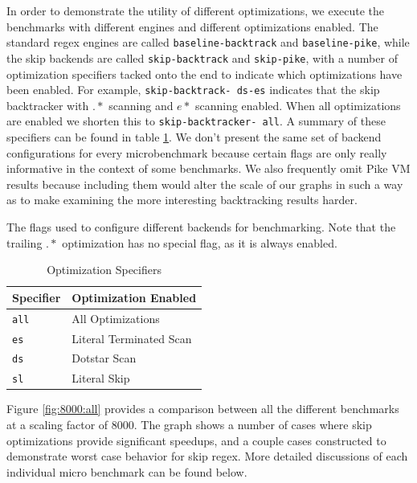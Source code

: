 In order to demonstrate the utility of different optimizations,
we execute the benchmarks with different engines and different
optimizations enabled. The standard regex engines are called
\texttt{baseline\allowbreak -\allowbreak backtrack} and
\texttt{baseline\allowbreak -\allowbreak pike}, while the
skip backends are called \texttt{skip\allowbreak -\allowbreak backtrack}
and \texttt{skip\allowbreak -\allowbreak pike},
with a number of optimization specifiers tacked onto the end to
indicate which optimizations have been enabled. For example,
\texttt{skip\allowbreak -\allowbreak backtrack\allowbreak -\allowbreak
        ds\allowbreak -\allowbreak es}
indicates that the skip backtracker with $.*$ scanning and $e*$ scanning
enabled. When all optimizations are enabled we shorten this to
\texttt{skip\allowbreak -\allowbreak backtracker\allowbreak -\allowbreak
all}. A summary of these specifiers can be found in table \ref{table:optspec}.
We don't present the same set of backend configurations for
every microbenchmark because certain flags are only really informative
in the context of some benchmarks. We also frequently omit Pike VM
results because including them would alter the scale of our
graphs in such a way as to make examining the more interesting
backtracking results harder.

\begin{table}
\caption{Optimization Specifiers}
\label{table:optspec}
\centering

The flags used to configure different backends for benchmarking.
Note that the trailing $.*$ optimization has no special flag,
as it is always enabled.

\begin{tabular}{| l | l |} \hline
Specifier & Optimization Enabled \\ \hline
\texttt{all} & All Optimizations \\ \hline
\texttt{es} & Literal Terminated Scan \\ \hline
\texttt{ds} & Dotstar Scan \\ \hline
\texttt{sl} & Literal Skip \\ \hline
\end{tabular}

\end{table}

Figure \ref{fig:8000:all} provides a comparison between all the
different benchmarks at a scaling factor of 8000. The graph shows a number
of cases where skip optimizations provide significant speedups,
and a couple cases constructed to demonstrate worst case
behavior for skip regex. More detailed discussions of each individual
micro benchmark can be found below.

